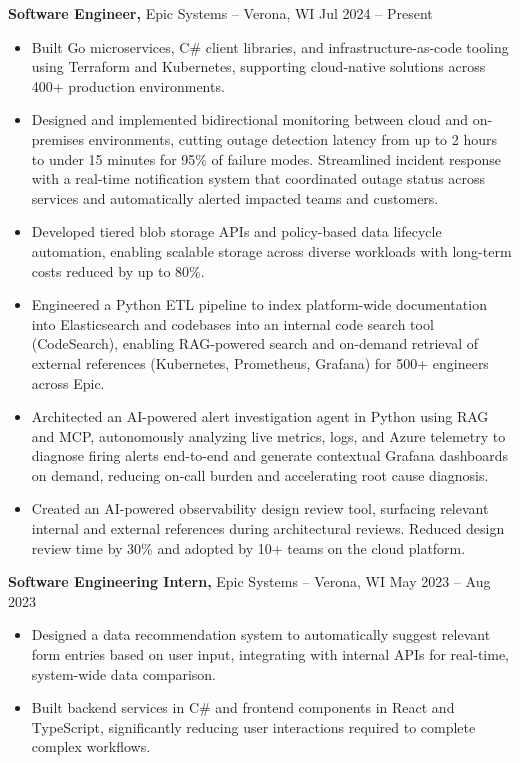 \documentclass[11pt]{article}
\begin{document}
\textbf{Software Engineer,} Epic Systems -- Verona, WI \hfill Jul 2024 -- Present \\
\vspace{-9pt}
\begin{itemize}
  \item Built Go microservices, C\# client libraries, and infrastructure-as-code tooling using Terraform and Kubernetes, supporting cloud-native solutions across 400+ production environments.
  \item Designed and implemented bidirectional monitoring between cloud and on-premises environments, cutting outage detection latency from up to 2 hours to under 15 minutes for 95\% of failure modes. Streamlined incident response with a real-time notification system that coordinated outage status across services and automatically alerted impacted teams and customers.
  \item Developed tiered blob storage APIs and policy-based data lifecycle automation, enabling scalable storage across diverse workloads with long-term costs reduced by up to 80\%.
  \item Engineered a Python ETL pipeline to index platform-wide documentation into Elasticsearch and codebases into an internal code search tool (CodeSearch), enabling RAG-powered search and on-demand retrieval of external references (Kubernetes, Prometheus, Grafana) for 500+ engineers across Epic.
  \item Architected an AI-powered alert investigation agent in Python using RAG and MCP, autonomously analyzing live metrics, logs, and Azure telemetry to diagnose firing alerts end-to-end and generate contextual Grafana dashboards on demand, reducing on-call burden and accelerating root cause diagnosis.
  \item Created an AI-powered observability design review tool, surfacing relevant internal and external references during architectural reviews. Reduced design review time by 30\% and adopted by 10+ teams on the cloud platform.

\end{itemize}

\textbf{Software Engineering Intern,} Epic Systems -- Verona, WI \hfill May 2023 -- Aug 2023 \\
\vspace{-9pt}
\begin{itemize}
  \item Designed a data recommendation system to automatically suggest relevant form entries based on user input, integrating with internal APIs for real-time, system-wide data comparison.
  \item Built backend services in C\# and frontend components in React and TypeScript, significantly reducing user interactions required to complete complex workflows.
\end{itemize}
\end{document}
